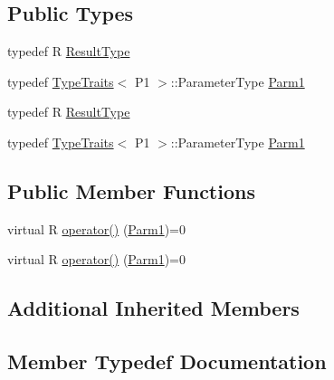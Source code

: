 \subsection*{Public Types}
\begin{DoxyCompactItemize}
\item 
typedef R \mbox{\hyperlink{classUtil_1_1FunctorImpl_3_01R_00_01TYPELIST__1_07P1_08_4_a15eeae50d81fe84dfae39ecc200cb08a}{Result\+Type}}
\item 
typedef \mbox{\hyperlink{classUtil_1_1TypeTraits}{Type\+Traits}}$<$ P1 $>$\+::Parameter\+Type \mbox{\hyperlink{classUtil_1_1FunctorImpl_3_01R_00_01TYPELIST__1_07P1_08_4_a907de03623e2a575252ce08c64b52a8d}{Parm1}}
\item 
typedef R \mbox{\hyperlink{classUtil_1_1FunctorImpl_3_01R_00_01TYPELIST__1_07P1_08_4_a15eeae50d81fe84dfae39ecc200cb08a}{Result\+Type}}
\item 
typedef \mbox{\hyperlink{classUtil_1_1TypeTraits}{Type\+Traits}}$<$ P1 $>$\+::Parameter\+Type \mbox{\hyperlink{classUtil_1_1FunctorImpl_3_01R_00_01TYPELIST__1_07P1_08_4_a907de03623e2a575252ce08c64b52a8d}{Parm1}}
\end{DoxyCompactItemize}
\subsection*{Public Member Functions}
\begin{DoxyCompactItemize}
\item 
virtual R \mbox{\hyperlink{classUtil_1_1FunctorImpl_3_01R_00_01TYPELIST__1_07P1_08_4_a62c984afa0dca11e0101cfcba2052a8c}{operator()}} (\mbox{\hyperlink{structUtil_1_1Private_1_1FunctorImplBase_a9d61e693d6c616dea5bd9d9073c7d21a}{Parm1}})=0
\item 
virtual R \mbox{\hyperlink{classUtil_1_1FunctorImpl_3_01R_00_01TYPELIST__1_07P1_08_4_a62c984afa0dca11e0101cfcba2052a8c}{operator()}} (\mbox{\hyperlink{structUtil_1_1Private_1_1FunctorImplBase_a9d61e693d6c616dea5bd9d9073c7d21a}{Parm1}})=0
\end{DoxyCompactItemize}
\subsection*{Additional Inherited Members}


\subsection{Member Typedef Documentation}
\mbox{\label{classUtil_1_1FunctorImpl_3_01R_00_01TYPELIST__1_07P1_08_4_a907de03623e2a575252ce08c64b52a8d}} 
